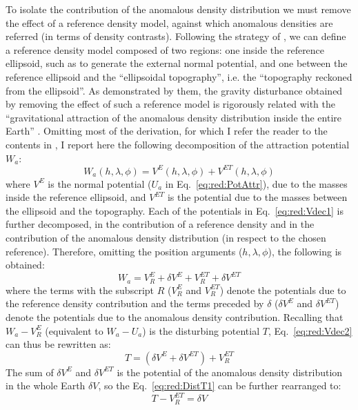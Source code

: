 To isolate the contribution of the anomalous density distribution we must remove the effect of a reference density model, against which anomalous densities are referred (in terms of density contrasts).
Following the strategy of \textcite{Vajda2006}, we can define a reference density model composed of two regions: one inside the reference ellipsoid, such as to generate the external normal potential, and one between the reference ellipsoid and the ``ellipsoidal topography'', i.e. the ``topography reckoned from the ellipsoid''.
As demonstrated by them, the gravity disturbance obtained by removing the effect of such a reference model is rigorously related with the ``gravitational attraction of the anomalous density distribution inside the entire Earth'' \parencite{Vajda2006}.
Omitting most of the derivation, for which I refer the reader to the contents in \textcite{Vajda2006}, I report here the following decomposition of the attraction potential $W_a$:
\begin{equation}
    \label{eq:red:Vdec1}
    W_a(h, \lambda, \phi) = V^{E}(h, \lambda, \phi) + V^{ET}(h, \lambda, \phi)
\end{equation}
where $V^{E}$ is the normal potential ($U_a$ in Eq.~\ref{eq:red:PotAttr}), due to the masses inside the reference ellipsoid, and $V^{ET}$ is the potential due to the masses between the ellipsoid and the topography.
Each of the potentials in Eq.~\ref{eq:red:Vdec1} is further decomposed, in the contribution of a reference density and in the contribution of the anomalous density distribution (in respect to the chosen reference). Therefore, omitting the position arguments ($h, \lambda, \phi$), the following is obtained:
\begin{equation}
    \label{eq:red:Vdec2}
    W_a = V_{R}^{E} + \delta V^{E} + V_{R}^{ET} + \delta V^{ET}
\end{equation}
where the terms with the subscript $R$ ($V_{R}^{E}$ and $V_{R}^{ET}$) denote the potentials due to the reference density contribution and the terms preceded by $\delta$ ($\delta V^{E}$ and $\delta V^{ET}$) denote the potentials due to the anomalous density contribution.
Recalling that $W_a - V_{R}^{E}$ (equivalent to $W_a - U_a$) is the disturbing potential $T$, Eq.~\ref{eq:red:Vdec2} can thus be rewritten as:
\begin{equation}
    \label{eq:red:DistT1}
    T = \left( \delta V^{E} + \delta V^{ET} \right) + V_{R}^{ET}
\end{equation}
The sum of $\delta V^{E}$ and $ \delta V^{ET}$ is the potential of the anomalous density distribution in the whole Earth $\delta V$, so the Eq.~\ref{eq:red:DistT1} can be further rearranged to:
\begin{equation}
    \label{eq:red:DistT2}
    T - V_{R}^{ET} = \delta V
\end{equation}


